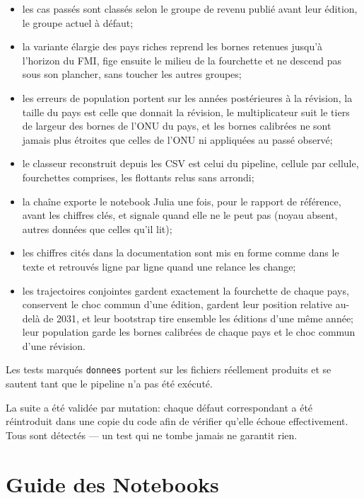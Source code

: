 \documentclass[11pt,a4paper]{article}
\begin{document}
\begin{itemize}
    \item les cas passés sont classés selon le groupe de revenu publié avant leur édition, le groupe actuel à défaut;
    \item la variante élargie des pays riches reprend les bornes retenues jusqu'à l'horizon du FMI, fige ensuite le milieu de la fourchette et ne descend pas sous son plancher, sans toucher les autres groupes;
    \item les erreurs de population portent sur les années postérieures à la révision, la taille du pays est celle que donnait la révision, le multiplicateur suit le tiers de largeur des bornes de l'ONU du pays, et les bornes calibrées ne sont jamais plus étroites que celles de l'ONU ni appliquées au passé observé;
    \item le classeur reconstruit depuis les CSV est celui du pipeline, cellule par cellule, fourchettes comprises, les flottants relus sans arrondi;
    \item la chaîne exporte le notebook Julia une fois, pour le rapport de référence, avant les chiffres clés, et signale quand elle ne le peut pas (noyau absent, autres données que celles qu'il lit);
    \item les chiffres cités dans la documentation sont mis en forme comme dans le texte et retrouvés ligne par ligne quand une relance les change;
    \item les trajectoires conjointes gardent exactement la fourchette de chaque pays, conservent le choc commun d'une édition, gardent leur position relative au-delà de 2031, et leur bootstrap tire ensemble les éditions d'une même année; leur population garde les bornes calibrées de chaque pays et le choc commun d'une révision.
\end{itemize}

Les tests marqués \texttt{donnees} portent sur les fichiers réellement produits et se sautent tant que le pipeline n'a pas été exécuté.

La suite a été validée par mutation: chaque défaut correspondant a été réintroduit dans une copie du code afin de vérifier qu'elle échoue effectivement. Tous sont détectés --- un test qui ne tombe jamais ne garantit rien.

\section{Guide des Notebooks}
\end{document}
